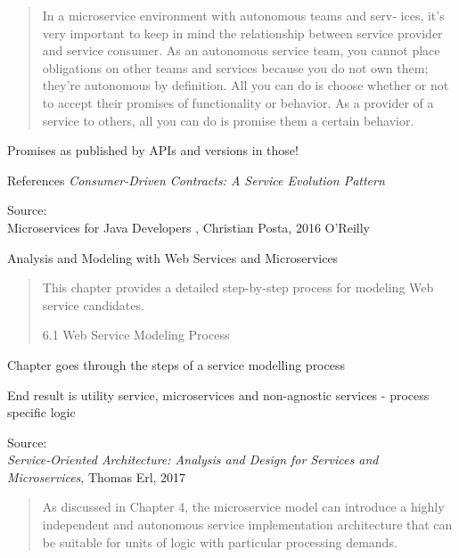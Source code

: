 \documentclass[Screen16to9,17pt]{foils}
\begin{document}

\begin{quote}
  In a microservice environment with autonomous teams and serv‐
  ices, it’s very important to keep in mind the relationship between
  service provider and service consumer. As an autonomous service
  team, you cannot place obligations on other teams and services
  because you do not own them; they’re autonomous by definition. All
  you can do is choose whether or not to accept their promises of
  functionality or behavior. As a provider of a service to others, all you
  can do is promise them a certain behavior.
\end{quote}

\begin{list2}
\item Promises as published by APIs and versions in those!
\item References \emph{Consumer-Driven Contracts: A Service Evolution Pattern}\\
\end{list2}
Source: {\footnotesize\\
Microservices for Java Developers , Christian Posta, 2016 O’Reilly}





Analysis and Modeling with Web Services and Microservices

\begin{quote}
This chapter provides a detailed step-by-step process for modeling Web service candidates.

6.1 Web Service Modeling Process
\end{quote}

\begin{list2}
\item Chapter goes through the steps of a service modelling process
\item End result is utility service, microservices and non-agnostic services - process specific logic
\end{list2}
Source: {\footnotesize\\
\emph{Service‑Oriented Architecture: Analysis and Design for Services and Microservices}, Thomas Erl, 2017}



\begin{quote}
  As discussed in Chapter 4, the microservice model can introduce a highly
  independent and autonomous service implementation architecture that can be suitable
  for units of logic with particular processing demands.
\end{quote}
\end{document}
